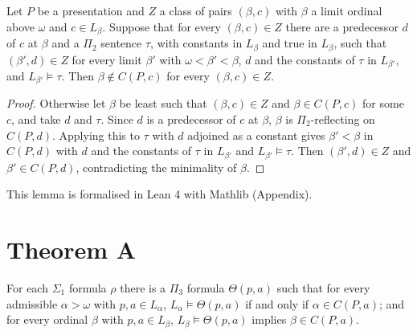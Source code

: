 \documentclass[11pt]{article}
\begin{document}
\begin{statement} Let $P$ be a presentation and $Z$ a class of pairs $(\beta, c)$ with $\beta$ a limit
ordinal above $\omega$ and $c \in L_{\beta}$. Suppose that for every $(\beta, c) \in Z$ there are a predecessor $d$ of
$c$ at $\beta$ and a $\Pi_2$ sentence $\tau$, with constants in $L_{\beta}$ and true in $L_{\beta}$, such that
$(\beta', d) \in Z$ for every limit $\beta'$ with $\omega < \beta' < \beta$, $d$ and the constants of $\tau$ in
$L_{\beta'}$, and $L_{\beta'} \models \tau$. Then $\beta \notin C(P, c)$ for every $(\beta, c) \in Z$.
\end{statement}

\begin{proof}
Otherwise let $\beta$ be least such that $(\beta, c) \in Z$ and $\beta \in C(P, c)$ for some $c$, and take $d$ and
$\tau$. Since $d$ is a predecessor of $c$ at $\beta$, $\beta$ is $\Pi_2$-reflecting on $C(P, d)$. Applying this to
$\tau$ with $d$ adjoined as a constant gives $\beta' < \beta$ in $C(P, d)$ with $d$ and the constants of $\tau$ in $L_{\beta'}$
and $L_{\beta'} \models \tau$. Then $(\beta', d) \in Z$ and $\beta' \in C(P, d)$, contradicting the minimality of $\beta$.
\end{proof}

This lemma is formalised in Lean 4 with Mathlib (Appendix).

\section{Theorem A}

\begin{statement} For each $\Sigma_1$ formula $\rho$ there is a $\Pi_3$ formula $\Theta(p, a)$ such
that for every admissible $\alpha > \omega$ with $p, a \in L_{\alpha}$, $L_{\alpha} \models \Theta(p, a)$ if and only
if $\alpha \in C(P, a)$; and for every ordinal $\beta$ with $p, a \in L_{\beta}$, $L_{\beta} \models \Theta(p, a)$
implies $\beta \in C(P, a)$.
\end{statement}
\end{document}
